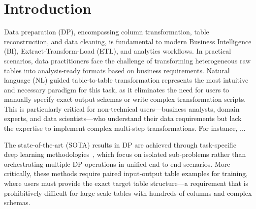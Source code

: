 


\section{Introduction}
\label{sec:intro}







Data preparation (DP), encompassing column transformation, table reconstruction, and data cleaning, is fundamental to modern Business Intelligence (BI), Extract-Transform-Load (ETL), and analytics workflows.
In practical scenarios, data practitioners face the challenge of transforming heterogeneous raw tables into analysis-ready formats based on business requirements. 
Natural language (NL) guided table-to-table transformation represents the most intuitive and necessary paradigm for this task, as it eliminates the need for users to manually specify exact output schemas or write complex transformation scripts.
This is particularly critical for non-technical users—business analysts, domain experts, and data scientists—who understand their data requirements but lack the expertise to implement complex multi-step transformations.
For instance, ...

The state-of-the-art (SOTA) results in DP are achieved through task-specific deep learning methodologies~\cite{DBLP:journals/pvldb/LiYLFT25, DBLP:conf/icde/FanHFC00024, yang2021auto}, which focus on isolated sub-problems rather than orchestrating multiple DP operations in unified end-to-end scenarios.
More critically, these methods require paired input-output table examples for training, where users must provide the exact target table structure—a requirement that is prohibitively difficult for large-scale tables with hundreds of columns and complex schemas.

